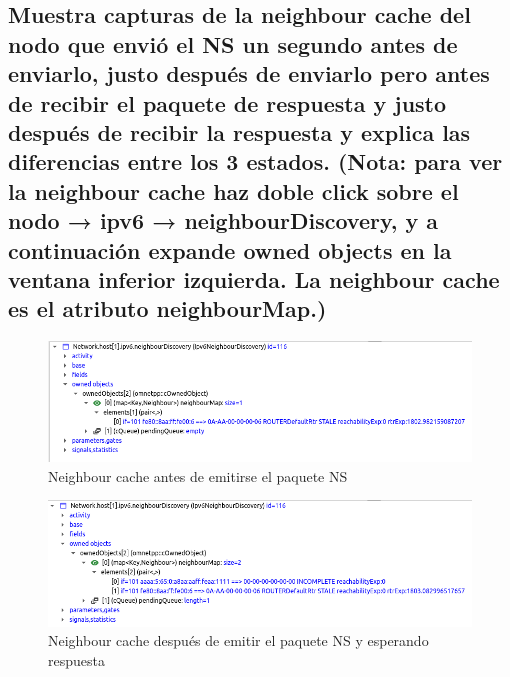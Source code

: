 \subsection{ Muestra capturas de la neighbour cache del nodo que envió el NS un segundo antes de enviarlo, justo después de enviarlo pero antes de recibir el paquete de respuesta y justo después de recibir la respuesta y explica las diferencias entre los 3 estados. (Nota: para ver la neighbour cache haz doble click sobre el nodo → ipv6 → neighbourDiscovery, y a continuación expande owned objects en la ventana inferior izquierda. La neighbour cache es el atributo neighbourMap.)}

\begin{figure}[h]
    \centering
    \includegraphics[width=1\textwidth]{img/ej13.1.png}
    \caption{Neighbour cache antes de emitirse el paquete NS}
    \label{fig:ej13.1}
\end{figure}

\begin{figure}[h]
    \centering
    \includegraphics[width=1\textwidth]{img/ej13.2.png}
    \caption{Neighbour cache después de emitir el paquete NS y esperando respuesta}
    \label{fig:ej13.2}
\end{figure}


